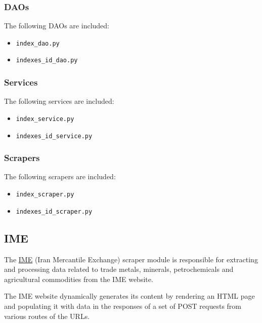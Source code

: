 {\begin{itemize}


	\end{itemize}

	\subsubsection{DAOs}

	The following DAOs are included:

	\begin{itemize}
	  \item \texttt{index\_dao.py}
	  \item \texttt{indexes\_id\_dao.py}
	\end{itemize}

	\subsubsection{Services}

	The following services are included:

	\begin{itemize}
	  \item \texttt{index\_service.py}
	  \item \texttt{indexes\_id\_service.py}
	\end{itemize}

	\subsubsection{Scrapers}

	The following scrapers are included:

	\begin{itemize}
	  \item \texttt{index\_scraper.py}
	  \item \texttt{indexes\_id\_scraper.py}
	\end{itemize}


	\newpage
	\subsection{IME}
	The \hyperlink{https://www.ime.co.ir//}{IME} (Iran Mercantile Exchange) scraper module is responsible for extracting and processing data related to trade metals, minerals, petrochemicals and agricultural commodities from the IME website.

	The IME website dynamically generates its content by rendering an HTML page and populating it with data in the responses of a set of POST requests from various routes of the URLs.

}
